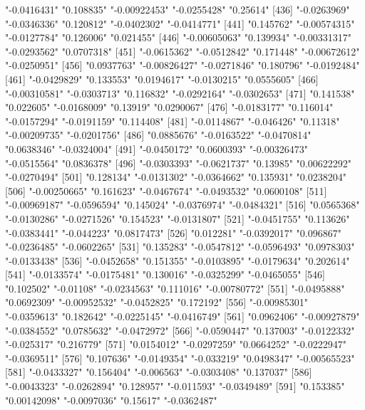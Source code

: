 \begin{Schunk}
\begin{Soutput}
[431] "-0.0416431"   "0.108835"     "-0.00922453"  "-0.0255428"   "0.25614"     
[436] "-0.0263969"   "-0.0346336"   "0.120812"     "-0.0402302"   "-0.0414771"  
[441] "0.145762"     "-0.00574315"  "-0.0127784"   "0.126006"     "0.021455"    
[446] "-0.00605063"  "0.139934"     "-0.00331317"  "-0.0293562"   "0.0707318"   
[451] "-0.0615362"   "-0.0512842"   "0.171448"     "-0.00672612"  "-0.0250951"  
[456] "0.0937763"    "-0.00826427"  "-0.0271846"   "0.180796"     "-0.0192484"  
[461] "-0.0429829"   "0.133553"     "0.0194617"    "-0.0130215"   "0.0555605"   
[466] "-0.00310581"  "-0.0303713"   "0.116832"     "-0.0292164"   "-0.0302653"  
[471] "0.141538"     "0.022605"     "-0.0168009"   "0.13919"      "0.0290067"   
[476] "-0.0183177"   "0.116014"     "-0.0157294"   "-0.0191159"   "0.114408"    
[481] "-0.0114867"   "-0.046426"    "0.11318"      "-0.00209735"  "-0.0201756"  
[486] "0.0885676"    "-0.0163522"   "-0.0470814"   "0.0638346"    "-0.0324004"  
[491] "-0.0450172"   "0.0600393"    "-0.00326473"  "-0.0515564"   "0.0836378"   
[496] "-0.0303393"   "-0.0621737"   "0.13985"      "0.00622292"   "-0.0270494"  
[501] "0.128134"     "-0.0131302"   "-0.0364662"   "0.135931"     "0.0238204"   
[506] "-0.00250665"  "0.161623"     "-0.0467674"   "-0.0493532"   "0.0600108"   
[511] "-0.00969187"  "-0.0596594"   "0.145024"     "-0.0376974"   "-0.0484321"  
[516] "0.0565368"    "-0.0130286"   "-0.0271526"   "0.154523"     "-0.0131807"  
[521] "-0.0451755"   "0.113626"     "-0.0383441"   "-0.044223"    "0.0817473"   
[526] "0.012281"     "-0.0392017"   "0.096867"     "-0.0236485"   "-0.0602265"  
[531] "0.135283"     "-0.0547812"   "-0.0596493"   "0.0978303"    "-0.0133438"  
[536] "-0.0452658"   "0.151355"     "-0.0103895"   "-0.0179634"   "0.202614"    
[541] "-0.0133574"   "-0.0175481"   "0.130016"     "-0.0325299"   "-0.0465055"  
[546] "0.102502"     "-0.01108"     "-0.0234563"   "0.111016"     "-0.00780772" 
[551] "-0.0495888"   "0.0692309"    "-0.00952532"  "-0.0452825"   "0.172192"    
[556] "-0.00985301"  "-0.0359613"   "0.182642"     "-0.0225145"   "-0.0416749"  
[561] "0.0962406"    "-0.00927879"  "-0.0384552"   "0.0785632"    "-0.0472972"  
[566] "-0.0590447"   "0.137003"     "-0.0122332"   "-0.025317"    "0.216779"    
[571] "0.0154012"    "-0.0297259"   "0.0664252"    "-0.0222947"   "-0.0369511"  
[576] "0.107636"     "-0.0149354"   "-0.033219"    "0.0498347"    "-0.00565523" 
[581] "-0.0433327"   "0.156404"     "-0.006563"    "-0.0303408"   "0.137037"    
[586] "-0.0043323"   "-0.0262894"   "0.128957"     "-0.011593"    "-0.0349489"  
[591] "0.153385"     "0.00142098"   "-0.0097036"   "0.15617"      "-0.0362487"  

\end{Soutput}
\end{Schunk}
